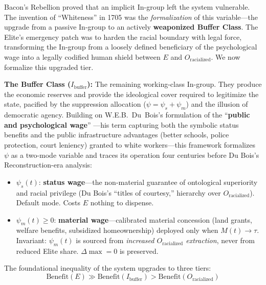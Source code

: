 Bacon's Rebellion proved that an implicit In-group left the system vulnerable. The invention of ``Whiteness'' in 1705 was the \textit{formalization} of this variable---the upgrade from a passive In-group to an actively \textbf{weaponized Buffer Class}. The Elite's emergency patch was to harden the racial boundary with legal force, transforming the In-group from a loosely defined beneficiary of the psychological wage into a legally codified human shield between $E$ and $O_{\text{racialized}}$. We now formalize this upgraded tier.

\begin{definition}
\textbf{The Buffer Class ($I_{\text{buffer}}$):} The remaining working-class In-group. They produce the economic reserves and provide the ideological cover required to legitimize the state, pacified by the suppression allocation ($\psi = \psi_s + \psi_m$) and the illusion of democratic agency. Building on W.E.B.\ Du~Bois's formulation of the ``\textbf{public and psychological wage}'' \cite{dubois}---his term capturing both the symbolic status benefits and the public infrastructure advantages (better schools, police protection, court leniency) granted to white workers---this framework formalizes $\psi$ as a two-mode variable and traces its operation four centuries before Du Bois's Reconstruction-era analysis:

\begin{itemize}
    \item $\psi_s(t)$: \textbf{status wage}---the non-material guarantee of ontological superiority and racial privilege (Du Bois's ``titles of courtesy,'' hierarchy over $O_{\text{racialized}}$). Default mode. Costs $E$ nothing to dispense.
    \item $\psi_m(t) \geq 0$: \textbf{material wage}---calibrated material concession (land grants, welfare benefits, subsidized homeownership) deployed only when $M(t) \to \tau$. Invariant: $\psi_m(t)$ is sourced from \textit{increased $O_{\text{racialized}}$ extraction}, never from reduced Elite share. $\Delta\max = 0$ is preserved.
\end{itemize}
\end{definition}

The foundational inequality of the system upgrades to three tiers:
\begin{equation}\label{eq:3.4-three-tier-post-bacon}
\text{Benefit}(E) \gg \text{Benefit}(I_{\text{buffer}}) > \text{Benefit}(O_{\text{racialized}})
\end{equation}

